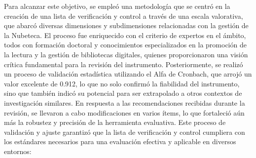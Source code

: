 \documentclass[spanish]{textolivre}
\begin{document}
Para alcanzar este objetivo, se empleó una metodología que se centró en la creación de una lista de verificación y control a través de una escala valorativa, que abarcó diversas dimensiones y subdimensiones relacionadas con la gestión de la Nubeteca. El proceso fue enriquecido con el criterio de expertos en el ámbito, todos con formación doctoral y conocimientos especializados en la promoción de la lectura y la gestión de bibliotecas digitales, quienes proporcionaron una visión crítica fundamental para la revisión del instrumento. Posteriormente, se realizó un proceso de validación estadística utilizando el Alfa de Cronbach, que arrojó un valor excelente de 0.912, lo que no solo confirmó la fiabilidad del instrumento, sino que también indicó su potencial para ser extrapolado a otros contextos de investigación similares. En respuesta a las recomendaciones recibidas durante la revisión, se llevaron a cabo modificaciones en varios ítems, lo que fortaleció aún más la robustez y precisión de la herramienta evaluativa. Este proceso de validación y ajuste garantizó que la lista de verificación y control cumpliera con los estándares necesarios para una evaluación efectiva y aplicable en diversos entornos:
\end{document}
